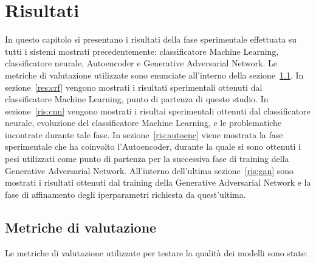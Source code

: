 \chapter{Risultati}
\label{risultati}
In questo capitolo si presentano i risultati della fase sperimentale effettuata su tutti i sistemi mostrati precedentemente: classificatore Machine Learning, classificatore neurale, Autoencoder e Generative Adversarial Network. Le metriche di valutazione utilizzate sono enunciate all'interno della sezione~\ref{metriche}. In sezione~\ref{res:crf} vengono mostrati i risultati sperimentali ottenuti dal classificatore Machine Learning, punto di partenza di questo studio. In sezione~\ref{ris:cnn} vengono mostrati i risultai sperimentali ottenuti dal classificatore neurale, evoluzione del classificatore Machine Learning, e le problematiche incontrate durante tale fase. In sezione~\ref{ris:autoenc} viene mostrata la fase sperimentale che ha coinvolto l'Autoencoder, durante la quale si sono ottenuti i pesi utilizzati  come punto di partenza per la successiva fase di training della Generative Adversarial Network. All'interno dell'ultima sezione~\ref{ris:gan} sono mostrati i risultati ottenuti dal training della Generative Adversarial Network e la fase di affinamento degli iperparametri richiesta da quest'ultima.

\pagebreak
\section{Metriche di valutazione}
\label{metriche}
Le metriche di valutazione utilizzate per testare la qualità dei modelli sono state:

